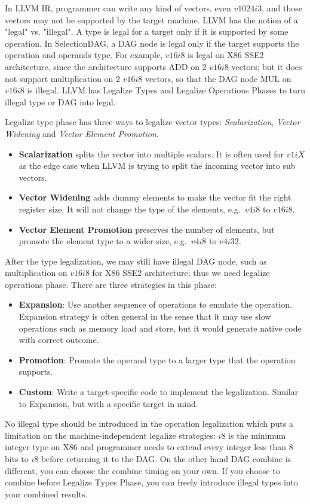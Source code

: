 In LLVM IR, programmer can write any kind of vectors, even $v1024i3$, and those vectors may not be supported by the target machine. LLVM has the notion of a "legal" vs. "illegal". A type is legal for a target only if it is supported by some operation. In SelectionDAG, a DAG node is legal only if the target supports the operation and operands type. For example, $v16i8$ is legal on X86 SSE2 architecture, since the architecture supports ADD on 2 $v16i8$ vectors; but it does not support multiplication on 2 $v16i8$ vectors, so that the DAG node MUL on $v16i8$ is illegal. LLVM has Legalize Types and Legalize Operations Phases to turn illegal type or DAG into legal\cite{llvm_code_gen}.

Legalize type phase has three ways to legalize vector types\cite{hybrid_simd_type_legalize}: \textit{Scalarization}, \textit{Vector Widening} and \textit{Vector Element Promotion}.

\begin{itemize}
    \item \textbf{Scalarization} splits the vector into multiple scalars. It is often used for $v1iX$ as the edge case when LLVM is trying to split the incoming vector into sub vectors.
    \item \textbf{Vector Widening} adds dummy elements to make the vector fit the right register size. It will not change the type of the elements, e.g.\ $v4i8$ to $v16i8$.
    \item \textbf{Vector Element Promotion} preserves the number of elements, but promote the element type to a wider size, e.g.\ $v4i8$ to $v4i32$.
\end{itemize}

After the type legalization, we may still have illegal DAG node, such as multiplication on $v16i8$ for X86 SSE2 architecture; thus we need legalize operations phase. There are three strategies in this phase:

\begin{itemize}
    \item \textbf{Expansion}: Use another sequence of operations to emulate the operation. Expansion strategy is often general in the sense that it may use slow operations such as memory load and store, but it would generate native code with correct outcome.
    \item \textbf{Promotion}: Promote the operand type to a larger type that the operation supports.
    \item \textbf{Custom}: Write a target-specific code to implement the legalization. Similar to Expansion, but with a specific target in mind.
\end{itemize}

No illegal type should be introduced in the operation legalization which puts a limitation on the machine-independent legalize strategies: $i8$ is the minimum integer type on X86 and programmer needs to extend every integer less than 8 bits to $i8$ before returning it to the DAG\@. On the other hand DAG combine is different, you can choose the combine timing on your own. If you choose to combine before Legalize Types Phase, you can freely introduce illegal types into your combined results.
